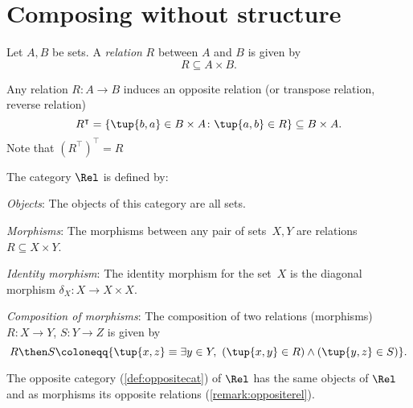 \section{Composing without structure}

\begin{definition}[Relation]
Let $A,B$ be sets. A \emph{relation} $R$ between $A$ and $B$ is given by 
\begin{equation}
    R\subseteq A\times B.
\end{equation}
\end{definition}
\begin{remark}
\label{remark:oppositerel}
Any relation $R\colon A\to B$ induces an opposite relation (or transpose relation, reverse relation) \begin{equation}
    R^\intercal =\{\tup{b,a}\in B\times A\colon \tup{a,b}\in R\} \subseteq B\times A.
\end{equation}
Note that $\left( R^\intercal\right)^\intercal = R$
\end{remark}

\begin{definition}
    The category $\Rel$ is defined by:
    \begin{compactenum}
    \item \emph{Objects}: The objects of this category are all sets.
    \item \emph{Morphisms}: The morphisms between any pair of sets~$X, Y$
    are relations $R\subseteq X\times Y$.
    \item \emph{Identity morphism}: The identity morphism for the set~$X$
    is the diagonal morphism $\delta_X \colon X\to X\times X$.
    \item \emph{Composition of morphisms}: The composition of two relations (morphisms) $R \colon X\to Y$, $S\colon Y\to Z$ is given by
    \begin{equation*}
    R \then S \coloneqq \{\tup{x,z} \equiv  \exists y \in Y, \ \left(\tup{x,y} \in R\right) \wedge \left(\tup{y,z} \in S\right)\}.
    \end{equation*}
    \end{compactenum}
\end{definition}
\begin{remark}
The opposite category (\cref{def:oppositecat}) of $\Rel$ has the same objects of $\Rel$ and as morphisms its opposite relations (\cref{remark:oppositerel}).
\end{remark}

